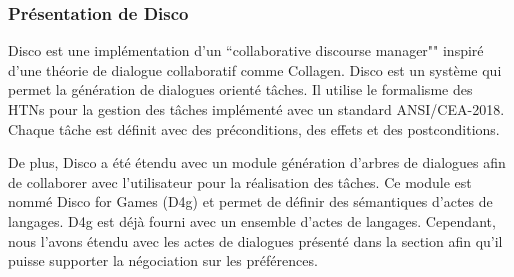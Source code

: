 \documentclass[a4paper,french]{article}
\begin{document}
\subsubsection{Présentation de Disco}
Disco est une implémentation d'un ``collaborative discourse manager"" inspiré d'une théorie de dialogue collaboratif comme Collagen.  Disco est un système qui permet la génération de dialogues orienté tâches. Il utilise le formalisme des HTNs pour la gestion des tâches implémenté avec un standard ANSI/CEA-2018.
Chaque tâche est définit avec des préconditions, des effets et des postconditions. 
\par De plus, Disco a été étendu avec un module génération d'arbres de dialogues afin de collaborer avec l'utilisateur pour la réalisation des tâches. Ce module est nommé Disco for Games (D4g) et permet de définir des sémantiques d'actes de langages. D4g est déjà fourni avec un ensemble d'actes de langages. Cependant, nous l'avons étendu avec les actes de dialogues présenté dans la section afin qu'il puisse supporter la négociation sur les préférences. 
\end{document}
